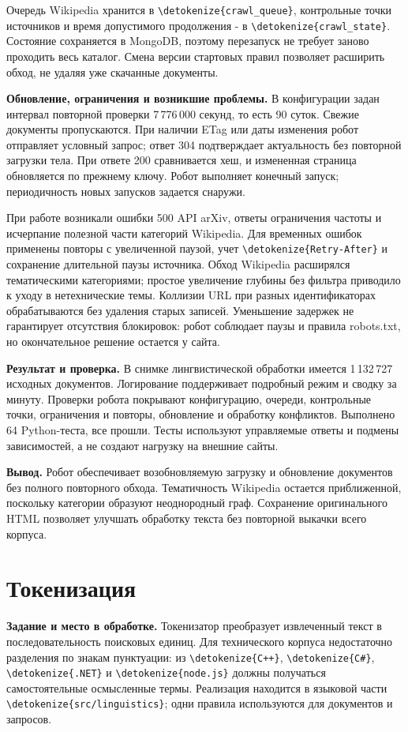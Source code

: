 \documentclass[pdf,unicode,12pt,a4paper,oneside,fleqn]{article}
\newcommand{\labsection}[2]{\par\Needspace{9\baselineskip}\setcounter{section}{\numexpr#1-1\relax}\section{#2}}
\newcommand{\partlabel}[1]{\par\Needspace{4\baselineskip}\medskip\textbf{#1.}\quad}
\DeclareRobustCommand{\code}[1]{\expandafter\nolinkurl\expandafter{\detokenize{#1}}}
\begin{document}
Очередь Wikipedia хранится в \code{crawl_queue}, контрольные точки источников
и время допустимого продолжения - в \code{crawl_state}. Состояние сохраняется
в MongoDB, поэтому перезапуск не требует заново проходить весь каталог.
Смена версии стартовых правил позволяет расширить обход, не удаляя уже
скачанные документы.

\partlabel{Обновление, ограничения и возникшие проблемы}
В конфигурации задан интервал повторной проверки 7\,776\,000 секунд,
то есть 90 суток. Свежие документы пропускаются. При наличии ETag или даты
изменения робот отправляет условный запрос; ответ 304 подтверждает актуальность
без повторной загрузки тела. При ответе 200 сравнивается хеш, и измененная
страница обновляется по прежнему ключу. Робот выполняет конечный запуск;
периодичность новых запусков задается снаружи.

При работе возникали ошибки 500 API arXiv, ответы ограничения частоты и
исчерпание полезной части категорий Wikipedia. Для временных ошибок применены
повторы с увеличенной паузой, учет \code{Retry-After} и сохранение длительной
паузы источника. Обход Wikipedia расширялся тематическими категориями;
простое увеличение глубины без фильтра приводило к уходу в нетехнические темы.
Коллизии URL при разных идентификаторах обрабатываются без удаления старых
записей. Уменьшение задержек не гарантирует отсутствия блокировок: робот
соблюдает паузы и правила robots.txt, но окончательное решение остается у сайта.

\partlabel{Результат и проверка}
В снимке лингвистической обработки имеется 1\,132\,727 исходных документов.
Логирование поддерживает подробный режим и сводку за минуту. Проверки робота
покрывают конфигурацию, очереди, контрольные точки, ограничения и повторы,
обновление и обработку конфликтов. Выполнено 64 Python-теста, все прошли.
Тесты используют управляемые ответы и подмены зависимостей, а не создают
нагрузку на внешние сайты.

\partlabel{Вывод}
Робот обеспечивает возобновляемую загрузку и обновление документов без
полного повторного обхода. Тематичность Wikipedia остается приближенной,
поскольку категории образуют неоднородный граф. Сохранение оригинального HTML
позволяет улучшать обработку текста без повторной выкачки всего корпуса.

\labsection{3}{Токенизация}

\partlabel{Задание и место в обработке}
Токенизатор преобразует извлеченный текст в последовательность поисковых единиц.
Для технического корпуса недостаточно разделения по знакам пунктуации:
из \code{C++}, \code{C#}, \code{.NET} и \code{node.js} должны получаться
самостоятельные осмысленные термы. Реализация находится в языковой части
\code{src/linguistics}; одни правила используются для документов и запросов.
\end{document}
